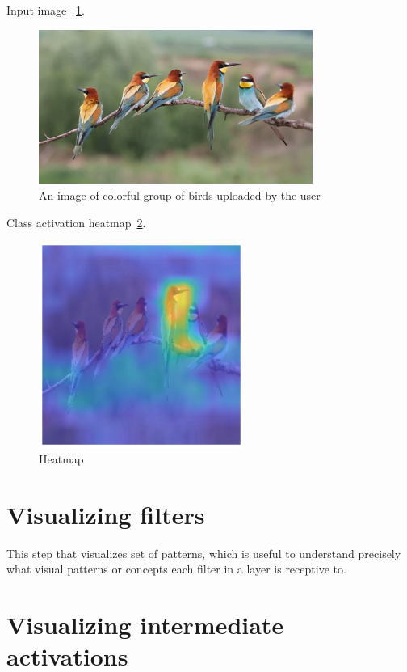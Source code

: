 Input image ~\ref{fig:myFig}.
\begin{figure}[htbp]
\centering
\includegraphics[width=0.80\textwidth]{images/colorful-group-of-birds-get-together_vkmuak6_e__F0000.png}
\caption{An image of colorful group of birds uploaded by the user}
\label{fig:myFig}
\end{figure}


Class activation heatmap~\ref{fig:heatmap-1}.
\begin{figure}[htbp]
\centering
\includegraphics[width=0.60\textwidth]{images/heatmap-class-activations.png}
\caption{}
\label{fig:heatmap-1}
\caption{Heatmap}
\end{figure}

\section*{Visualizing filters}

This step that visualizes set of patterns, which is useful to understand precisely what visual patterns or concepts each filter in a layer is receptive to.

\section*{Visualizing intermediate activations}

